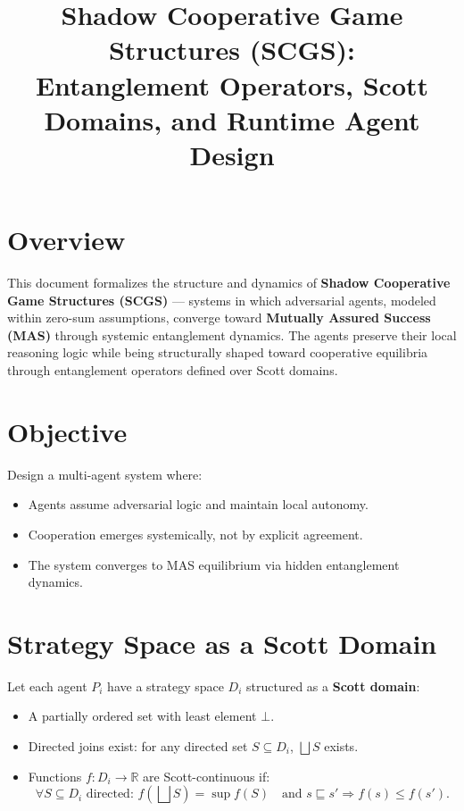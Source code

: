 \documentclass[11pt]{article}
\title{Shadow Cooperative Game Structures (SCGS):\\
Entanglement Operators, Scott Domains, and Runtime Agent Design}
\author{}
\date{}
\begin{document}
\maketitle

\section{Overview}

This document formalizes the structure and dynamics of \textbf{Shadow Cooperative Game Structures (SCGS)} — systems in which adversarial agents, modeled within zero-sum assumptions, converge toward \textbf{Mutually Assured Success (MAS)} through systemic entanglement dynamics. The agents preserve their local reasoning logic while being structurally shaped toward cooperative equilibria through entanglement operators defined over Scott domains.

\section{Objective}

Design a multi-agent system where:
\begin{itemize}[noitemsep]
    \item Agents assume adversarial logic and maintain local autonomy.
    \item Cooperation emerges systemically, not by explicit agreement.
    \item The system converges to MAS equilibrium via hidden entanglement dynamics.
\end{itemize}

\section{Strategy Space as a Scott Domain}

Let each agent $P_i$ have a strategy space $D_i$ structured as a \textbf{Scott domain}:
\begin{itemize}[noitemsep]
    \item A partially ordered set with least element $\bot$.
    \item Directed joins exist: for any directed set $S \subseteq D_i$, $\bigsqcup S$ exists.
    \item Functions $f: D_i \to \mathbb{R}$ are Scott-continuous if:
    \[
    \forall S \subseteq D_i \text{ directed: } f\left(\bigsqcup S\right) = \sup f(S)
    \quad \text{and } s \sqsubseteq s' \Rightarrow f(s) \leq f(s').
    \]
\end{itemize}
\end{document}
